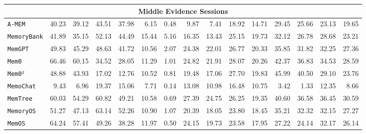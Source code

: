 \begin{table}[]
\begin{tabular}{l|r|r|r|r|r|r|r|r|r|r|r|r|r|r}
 \multicolumn{15}{c}{Middle Evidence Sessions}\\ \midrule
{\tt A-MEM}& 40.23 & 39.12 & 43.51 & 37.98 & 6.15 & 0.48 & 9.87 & 7.41 & 18.92 & 14.71 & 29.45 & 25.66 &23.13 &19.65 \\
{\tt MemoryBank} & 41.89 & 35.15 & 52.13 & 44.49 & 15.44 & 5.16 & 16.35 & 13.43 & 25.15 & 19.73 & 32.12 & 26.78 &28.68 &23.21 \\
{\tt MemGPT} & 49.83& 45.29& 48.63& 41.72& 10.56& 2.07& 24.38& 22.01& 26.77& 20.33& 35.85& 31.82 &32.25 &27.36\\ 
{\tt Mem0} & 66.46 & 60.15 & 34.52 & 28.05 & 11.29 & 1.01 & 24.82 & 21.91 & 28.07 & 20.26 & 42.37 & 36.83  &34.53 &28.59\\
{\tt Mem0$^g$} & 48.88 & 43.93 & 17.02 & 12.76 & 10.52 & 0.81 & 19.48 & 17.06 & 27.70 & 19.83 & 45.99 & 40.50  &29.10 &23.76\\
{\tt MemoChat} &9.43 &6.96 &19.37 &15.06 &7.71 &0.14 &13.08 &10.98 &16.48 &10.75 &3.42 &1.33 &12.35 &8.66 \\ 
{\tt MemTree} &60.03 &54.29 &60.82 &49.21 &10.58 &0.69 &27.39 &24.75 &26.25 &19.35 &40.60 &36.58 &36.45 &30.59 \\ 
{\tt MemoryOS} &51.27 &47.13 &63.14 &52.26 &10.90 &1.07 &20.39 &18.05 &23.80 &18.45 &35.21 &32.32 &32.15 &27.27 \\ 
{\tt MemOS} &64.24 &57.41 &49.26 &38.28 &11.97 &0.50 &24.15 &19.73 &23.58 &17.95 &27.22 &24.14 &32.17 &26.14\\ \midrule



\end{tabular}
\end{table}
